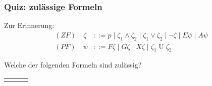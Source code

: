 \begin{frame}
  \frametitle{Quiz: zulässige Formeln}

  Zur Erinnerung:
  \begin{align*}
    (ZF)\quad \zeta & ::= p \mid \zeta_1 \land \zeta_2 \mid \zeta_1 \lor \zeta_2 \mid \neg \zeta \mid E\psi \mid A\psi \\
    (PF)\quad \psi  & ::= F\zeta \mid G\zeta \mid X\zeta \mid \zeta_1 \mathbin{U} \zeta_2
  \end{align*}

  \par\bigskip
   Welche der folgenden Formeln sind zulässig?
  \begin{center}
    \begin{tabular}{@{}lll@{}}
      \uncover<+->{$p \land q$ \quad $EFp$ \quad $AXp$} & \uncover<+->{\YES} &                                    \\[2pt]

\end{tabular}
\end{center}
\end{frame}
